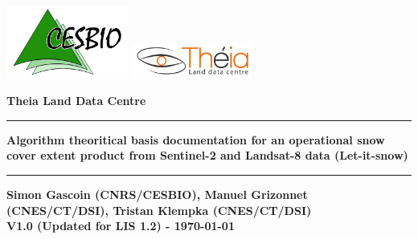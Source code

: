 \begin{titlepage}
\includegraphics[width=0.3\textwidth]{./images/logo_cesbio.png}
\hspace{5cm}
\includegraphics[width=0.3\textwidth]{./images/Theia_en.png}

\vspace{3cm}



\textcolor{PineGreen}{ \huge \bfseries Theia Land Data Centre\\ }
\rule{\linewidth}{0.5mm}
\begin{center}
{ \huge \bfseries Algorithm theoritical basis documentation for an operational snow cover extent product from Sentinel-2 and Landsat-8 data (Let-it-snow)\\}
\rule{\linewidth}{0.5mm}
{ \large \bfseries Simon Gascoin (CNRS/CESBIO), Manuel Grizonnet (CNES/CT/DSI), Tristan Klempka (CNES/CT/DSI)\\ }
{ \large \bfseries V1.0 (Updated for LIS 1.2) - \today \\ }



\end{center}
\end{titlepage}
